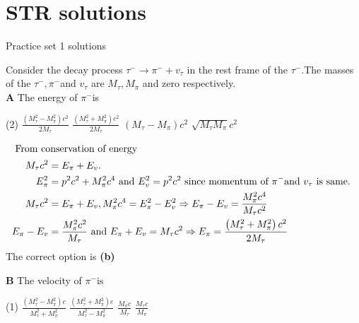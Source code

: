 \chapter{STR solutions}
\begin{abox}
	Practice set 1 solutions
	\end{abox}
\begin{enumerate}
\begin{minipage}{\textwidth}
	\item Consider the decay process $\tau^{-} \rightarrow \pi^{-}+v_{\tau}$ in the rest frame of the $\tau^{-} .$The masses of the $\tau^{-}, \pi^{-}$and $v_{\tau}$ are $M_{\tau}, M_{\pi}$ and zero respectively.\\
	\textbf{A} The energy of $\pi^{-}$is
\end{minipage}
\begin{tasks}(2)
	\task[\textbf{A.}] $\frac{\left(M_{\tau}^{2}-M_{\pi}^{2}\right) c^{2}}{2 M_{\tau}}$
	\task[\textbf{B.}]$\frac{\left(M_{\tau}^{2}+M_{\pi}^{2}\right) c^{2}}{2 M_{\tau}}$
	\task[\textbf{C.}]$\left(M_{\tau}-M_{\pi}\right) c^{2}$
	\task[\textbf{D.}]$\sqrt{M_{\tau} M_{\pi}} c^{2}$
\end{tasks}
\begin{answer}
	\begin{align*}
	\intertext { From conservation of energy }
	 M_{\tau} c^{2}&=E_{\pi}+E_{v} \text {. }\\
	E_{\pi}^{2}&=p^{2} c^{2}+M_{\pi}^{2} c^{4} \text { and } E_{v}^{2}=p^{2} c^{2} \text { since momentum of } \pi^{-} \text {and } v_{\tau} \text { is same. }\\
	M_{\tau} c^{2}&=E_{\pi}+E_{v}, M_{\pi}^{2} c^{4}=E_{\pi}^{2}-E_{v}^{2} \Rightarrow E_{\pi}-E_{v}=\frac{M_{\pi}^{2} c^{4}}{M_{\tau} c^{2}}\\
	E_{\pi}-E_{v}&=\frac{M_{\pi}^{2} c^{2}}{M_{\tau}} \text { and } E_{\pi}+E_{v}=M_{\tau} c^{2} \Rightarrow E_{\pi}=\frac{\left(M_{\tau}^{2}+M_{\pi}^{2}\right) c^{2}}{2 M_{\tau}}
	\end{align*}
	The correct option is \textbf{(b)}
\end{answer}
\textbf{B} The velocity of  $\pi^{-} \text {is }$
\begin{tasks}(1)
	\task[\textbf{A.}] $\frac{\left(M_{\tau}^{2}-M_{\pi}^{2}\right) c}{M_{\tau}^{2}+M_{\pi}^{2}}$
	\task[\textbf{B.}]$\frac{\left(M_{\tau}^{2}+M_{\pi}^{2}\right) c}{M_{\tau}^{2}-M_{\pi}^{2}}$ 
	\task[\textbf{C.}] $\frac{M_{\pi} c}{M_{\tau}}$
	\task[\textbf{D.}]$\frac{M_{\tau} c}{M_{\pi}}$
\end{tasks}

\end{enumerate}
